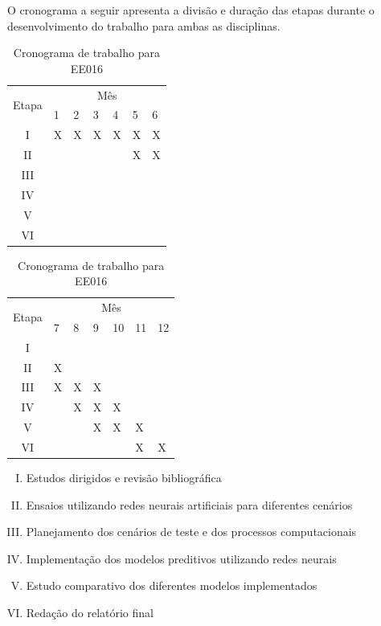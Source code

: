 \documentclass[a4paper, 12pt]{article}
\begin{document}
O cronograma a seguir apresenta a divisão e duração das etapas durante o desenvolvimento do trabalho para ambas as disciplinas.
\vspace{1em}

\begin{table}[!htb]
    \begin{subtable}{.5\linewidth}
      \centering
		\begin{tabular}{|c|l|l|l|l|l|l|}
		\hline
		\multirow{2}{*}{Etapa} & \multicolumn{6}{c|}{Mês} \\ \cline{2-7} 
		                       & 1  & 2  & 3  & 4 & 5 & 6 \\ \hline
		I                      & X  & X  & X  & X & X & X \\ \hline
		II                     &    &    &    &  & X & X \\ \hline
		III                    &    &    &    &   &   &   \\ \hline
		IV                    &    &    &    &   &   &   \\ \hline
		V                    &    &    &    &   &   &   \\ \hline
		VI                    &    &    &    &   &   &   \\ \hline
		\end{tabular}
		\caption{Cronograma de trabalho para EE015}
    \end{subtable}%
    \begin{subtable}{.5\linewidth}
      \centering
		\begin{tabular}{|c|l|l|l|l|l|l|}
		\hline
		\multirow{2}{*}{Etapa} & \multicolumn{6}{c|}{Mês} \\ \cline{2-7} 
		                       & 7  & 8  & 9  & 10 & 11 & 12 \\ \hline
		I                      &    &    &    &   &   &   \\ \hline
		II                     & X &   &   &  &   &   \\ \hline
		III                    & X  & X  & X &  &  & \\ \hline
		IV                    &    &  X & X  & X &   &   \\ \hline
		V                    &    &    &  X & X & X &   \\ \hline
		VI                    &    &    &   &  & X & X \\ \hline		
		\end{tabular}
		\caption{Cronograma de trabalho para EE016}
    \end{subtable} 
\end{table}
\begin{enumerate}[I.]
\item Estudos dirigidos e revisão bibliográfica 
\item Ensaios utilizando redes neurais artificiais para diferentes cenários
\item Planejamento dos cenários de teste e dos processos computacionais
\item Implementação dos modelos preditivos utilizando redes neurais
\item Estudo comparativo dos diferentes modelos implementados
\item Redação do relatório final
\end{enumerate}
\end{document}
